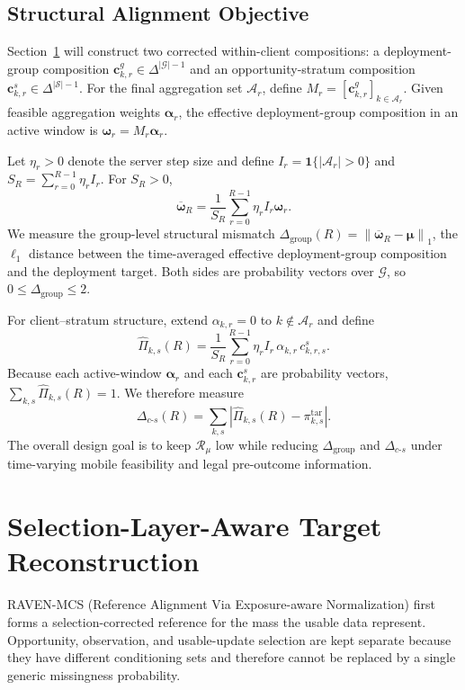 \subsection{Structural Alignment Objective}
\label{subsec:design_objective}

Section~\ref{sec:reconstruction} will construct two corrected within-client
compositions: a deployment-group composition
$\mathbf{c}^{g}_{k,r}\in\Delta^{|\mathcal{G}|-1}$ and an opportunity-stratum
composition $\mathbf{c}^{s}_{k,r}\in\Delta^{|\mathcal{S}|-1}$.  For the final
aggregation set $\mathcal{A}_r$, define
$M_r=[\mathbf{c}^{g}_{k,r}]_{k\in\mathcal{A}_r}$.
Given feasible aggregation weights $\boldsymbol\alpha_r$, the effective
deployment-group composition in an active window is
$\boldsymbol\omega_r=M_r\boldsymbol\alpha_r$.

Let $\eta_r>0$ denote the server step size and define
$I_r=\mathbf{1}\{|\mathcal{A}_r|>0\}$ and
$S_R=\sum_{r=0}^{R-1}\eta_r I_r$.
For $S_R>0$,
\begin{equation}
    \overline{\boldsymbol\omega}_R
    =
    \frac{1}{S_R}
    \sum_{r=0}^{R-1}
    \eta_r I_r\boldsymbol\omega_r.
    \label{eq:omega_bar}
\end{equation}
We measure the group-level structural mismatch
$\Delta_{\mathrm{group}}(R)=\left\|
\overline{\boldsymbol\omega}_R-\boldsymbol\mu
\right\|_1$,
the $\ell_1$ distance between the time-averaged effective deployment-group
composition and the deployment target.  Both sides are probability vectors
over $\mathcal{G}$, so $0\le\Delta_{\mathrm{group}}\le2$.

For client--stratum structure, extend $\alpha_{k,r}=0$ to
$k\notin\mathcal{A}_r$ and define
\begin{equation}
 \widehat\Pi_{k,s}(R)
 =
 \frac{1}{S_R}
 \sum_{r=0}^{R-1}
 \eta_r I_r\,
 \alpha_{k,r}\,
 c^{s}_{k,r,s}.
 \label{eq:Pi_hat_ks}
\end{equation}
Because each active-window $\boldsymbol\alpha_r$ and each
$\mathbf{c}^{s}_{k,r}$ are probability vectors,
$\sum_{k,s}\widehat\Pi_{k,s}(R)=1$.  We therefore measure
\begin{equation}
 \Delta_{c\text{-}s}(R)
 =
 \sum_{k,s}
 \left|
 \widehat\Pi_{k,s}(R)-\pi^{\mathrm{tar}}_{k,s}
 \right|.
 \label{eq:delta_cs}
\end{equation}
The overall design goal is to keep $\mathcal{R}_{\mu}$ low while
reducing $\Delta_{\mathrm{group}}$ and $\Delta_{c\text{-}s}$ under
time-varying mobile feasibility and legal pre-outcome information.


\section{Selection-Layer-Aware Target Reconstruction}
\label{sec:reconstruction}

RAVEN-MCS (Reference Alignment Via Exposure-aware Normalization) first forms a
selection-corrected reference for the mass the usable data represent.
Opportunity, observation, and usable-update selection are kept separate
because they have different conditioning sets and therefore cannot be
replaced by a single generic missingness probability.

